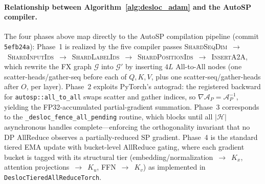 \documentclass{article}
\begin{document}
\paragraph{Relationship between Algorithm~\ref{alg:desloc_adam} and the AutoSP compiler.}
The four phases above map directly to the AutoSP compilation pipeline
(commit \texttt{5efb24a}):
Phase~1 is realized by the five compiler passes
\textsc{ShardSeqDim}~$\to$~\textsc{ShardInputIds}~$\to$~\textsc{ShardLabelIds}~$\to$~\textsc{ShardPositionIds}~$\to$~\textsc{InsertA2A},
which rewrite the FX graph $\mathcal{G}$ into $\mathcal{G}'$ by inserting
$4L$ All-to-All nodes (one scatter-heads/gather-seq before each of $Q,K,V$,
plus one scatter-seq/gather-heads after $O$, per layer).
Phase~2 exploits PyTorch's autograd: the registered backward for
\texttt{autosp::all\_to\_all} swaps scatter and gather indices, so
$\nabla \mathcal{A}_P = \mathcal{A}_P^{-1}$, yielding the FP32-accumulated
partial-gradient summation.
Phase~3 corresponds to the \texttt{\_desloc\_fence\_all\_pending} routine,
which blocks until all $|\mathcal{H}|$ asynchronous handles complete---enforcing
the orthogonality invariant that no DP AllReduce observes a partially-reduced
SP gradient.
Phase~4 is the standard tiered EMA update with bucket-level AllReduce gating,
where each gradient bucket is tagged with its structural tier
(embedding/normalization~$\to$~$K_x$, attention projections~$\to$~$K_u$,
FFN~$\to$~$K_v$) as implemented in \texttt{DeslocTieredAllReduceTorch}.
\end{document}
